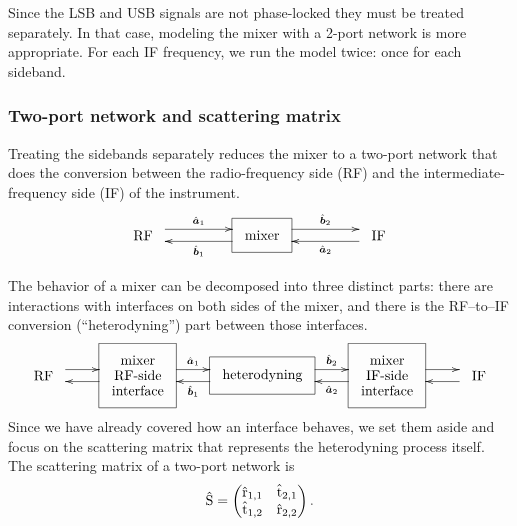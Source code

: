 Since the LSB and USB signals are not phase-locked they must be treated separately.
In that case, modeling the mixer with a 2-port network is more appropriate.
For each IF frequency, we run the model twice: once for each sideband.

\subsubsection{Two-port network and scattering matrix}

Treating the sidebands separately reduces the mixer to a two-port network that does the conversion between the radio-frequency side (RF) and the intermediate-frequency side (IF) of the instrument.
\begin{equation*}
\xymatrix@R=0pt@C=48pt{
        *+++\txt{RF}
        \ar@<1ex>[r]^-{\vectcp{a}_1}
        &
        *+++[F]\txt{mixer}
        \ar@<1ex>[l]^-{\vectcp{b}_1}
        \ar@<1ex>[r]^-{\vectcp{b}_2}
        &
        *+++\txt{IF}
        \ar@<1ex>[l]^-{\vectcp{a}_2} \\
    }
\end{equation*}

The behavior of a mixer can be decomposed into three distinct parts:
there are interactions with interfaces on both sides of the mixer, and there is the RF--to--IF conversion (``heterodyning'') part between those interfaces.
\begin{equation*}
    \entrymodifiers={+++[F]}
    \xymatrix{
        *+++\txt{RF}
        \ar@<1ex>[r]
        &
        \txt{mixer\\RF-side\\interface}
        \ar@<1ex>[l]
        \ar@<1ex>[r]^-{\vectcp{a}_1}
        &
        \txt{heterodyning}
        \ar@<1ex>[l]^-{\vectcp{b}_1}
        \ar@<1ex>[r]^-{\vectcp{b}_2}
        &
        \txt{mixer\\IF-side\\interface}
        \ar@<1ex>[l]^-{\vectcp{a}_2}
        \ar@<1ex>[r]
        &
        *+++\txt{IF}
        \ar@<1ex>[l]
    }
\end{equation*}
Since we have already covered how an interface behaves, we set them aside and focus on the scattering matrix that represents the heterodyning process itself.
The scattering matrix of a two-port network is
\begin{equation}
    \hat{\mathrm{S}}
    =
    \begin{pmatrix}
        \hat{\mathrm{r}}_{1,1} & \hat{\mathrm{t}}_{2,1} \\
        \hat{\mathrm{t}}_{1,2} & \hat{\mathrm{r}}_{2,2}
    \end{pmatrix}
    \text{.}
\end{equation}

